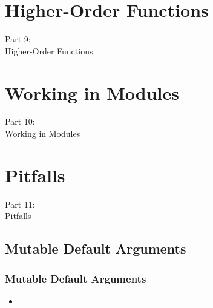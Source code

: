 
\section{Higher-Order Functions}
\begin{frame}
    \vspace{25mm}
    \begin{center}
        \Huge{Part 9:\\Higher-Order Functions}
    \end{center}
\end{frame}


\section{Working in Modules}
\begin{frame}
    \vspace{25mm}
    \begin{center}
        \Huge{Part 10:\\Working in Modules}
    \end{center}
\end{frame}


\section{Pitfalls}
\begin{frame}
    \vspace{25mm}
    \begin{center}
        \Huge{Part 11:\\Pitfalls}
    \end{center}
\end{frame}

\subsection{Mutable Default Arguments}
\begin{frame}
    \frametitle{Mutable Default Arguments}
    \vspace{5mm}
    
    \begin{itemize}
      \item 
    \end{itemize}
\end{frame}

